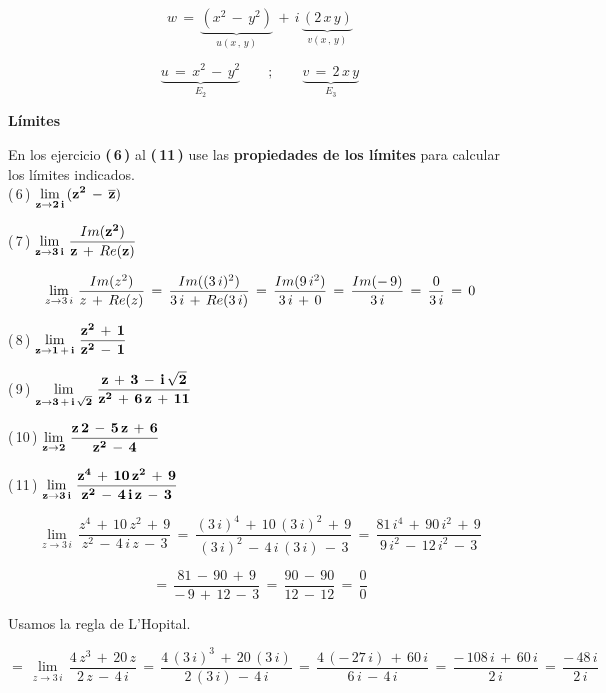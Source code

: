 \documentclass[a4paper,11pt,openany]{book}
\begin{document}
$$w\,=\,\underbrace{(x^{2}\,-\,y^{2})}_{u(x\,,\,y)}\,+\,i\,\underbrace{(2\,x\,y)}_{v(x\,,\,y)}$$

$$\underbrace{u\,=\,x^{2}\,-\,y^{2}}_{E_{2}} \qquad;\qquad \underbrace{v\,=\,2\,x\,y}_{E_{3}}$$

\begin{center}
\textbf{Límites}
\end{center}

En los ejercicio \textbf{(\,6\,)} al \textbf{(\,11\,)} use las \textbf{propiedades de los límites} para calcular los límites indicados.\\

\textcolor{ao(english)}{(\,6\,)} $\bf{\displaystyle\lim_{z \to 2\,i}\,(z^{2}\,-\,\overline{z})}$

\textcolor{ao(english)}{(\,7\,)} $\bf{\displaystyle\lim_{z \to 3\,i}\,\dfrac{\mathnormal{Im}(z^{2})}{z\,+\,\mathnormal{Re}(z)}}$

$$\displaystyle\lim_{z \to 3\,i}\,\dfrac{\mathnormal{Im}(z^{2})}{z\,+\,\mathnormal{Re}(z)}\,=\,\dfrac{\mathnormal{Im}((3\,i)^{2})}{3\,i\,+\,\mathnormal{Re}(3\,i)}\,=\,\dfrac{\mathnormal{Im}(9\,i^{2})}{3\,i\,+\,0}\,=\,\dfrac{\mathnormal{Im}(-\,9)}{3\,i}\,=\,\dfrac{0}{3\,i}\,=\,0$$

\textcolor{ao(english)}{(\,8\,)} $\bf{\displaystyle\lim_{z \to 1\,+\,i}\,\dfrac{z^{2}\,+\,1}{z^{2}\,-\,1}}$

\textcolor{ao(english)}{(\,9\,)} $\bf{\displaystyle\lim_{z \to 3\,+\,i\,\sqrt{2}}\,\dfrac{z\,+\,3\,-\,i\,\sqrt{2}}{z^{2}\,+\,6\,z\,+\,11}}$

\textcolor{ao(english)}{(\,10\,)} $\bf{\displaystyle\lim_{z \to 2}\,\dfrac{z\,2\,-\,5\,z\,+\,6}{z^{2}\,-\,4}}$

\textcolor{ao(english)}{(\,11\,)} $\bf{\displaystyle\lim_{z \to 3\,i}\,\dfrac{z^{4}\,+\,10\,z^{2}\,+\,9}{z^{2}\,-\,4\,i\,z\,-\,3}}$

$$\displaystyle\lim_{z \to 3\,i}\,\dfrac{z^{4}\,+\,10\,z^{2}\,+\,9}{z^{2}\,-\,4\,i\,z\,-\,3}\,=\,\dfrac{(3\,i)^{4}\,+\,10\,(3\,i)^{2}\,+\,9}{(3\,i)^{2}\,-\,4\,i\,(3\,i)\,-\,3}\,=\,\dfrac{81\,i^{4}\,+\,90\,i^{2}\,+\,9}{9\,i^{2}\,-\,12\,i^{2}\,-\,3}$$

$$=\,\dfrac{81\,-\,90\,+\,9}{-\,9\,+\,12\,-\,3}\,=\,\dfrac{90\,-\,90}{12\,-\,12}\,=\,\dfrac{0}{0}$$

\textcolor{ao(english)}{} Usamos la regla de L'Hopital.


$$=\,\displaystyle\lim_{z \to 3\,i}\,\dfrac{4\,z^{3}\,+\,20\,z}{2\,z\,-\,4\,i}\,=\,\dfrac{4\,(3\,i)^{3}\,+\,20\,(3\,i)}{2\,(3\,i)\,-\,4\,i}\,=\,\dfrac{4\,(-\,27\,i)\,+\,60\,i}{6\,i\,-\,4\,i}\,=\,\dfrac{-\,108\,i\,+\,60\,i}{2\,i}\,=\,\dfrac{-\,48\,i}{2\,i}$$
\end{document}
